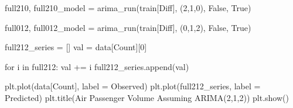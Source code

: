 \documentclass[
  letterpaper,
  DIV=11,
  numbers=noendperiod]{scrartcl}
\newenvironment{Shaded}{\begin{snugshade}}{\end{snugshade}}
\newcommand{\ControlFlowTok}[1]{\textcolor[rgb]{0.00,0.23,0.31}{#1}}
\newcommand{\DecValTok}[1]{\textcolor[rgb]{0.68,0.00,0.00}{#1}}
\newcommand{\KeywordTok}[1]{\textcolor[rgb]{0.00,0.23,0.31}{#1}}
\newcommand{\NormalTok}[1]{\textcolor[rgb]{0.00,0.23,0.31}{#1}}
\newcommand{\OperatorTok}[1]{\textcolor[rgb]{0.37,0.37,0.37}{#1}}
\newcommand{\StringTok}[1]{\textcolor[rgb]{0.13,0.47,0.30}{#1}}
\newcommand{\VariableTok}[1]{\textcolor[rgb]{0.07,0.07,0.07}{#1}}
\begin{document}
\begin{Shaded}
\begin{Highlighting}[]
\NormalTok{full210, full210\_model }\OperatorTok{=}\NormalTok{ arima\_run(train[}\StringTok{\textquotesingle{}Diff\textquotesingle{}}\NormalTok{], (}\DecValTok{2}\NormalTok{,}\DecValTok{1}\NormalTok{,}\DecValTok{0}\NormalTok{), }\VariableTok{False}\NormalTok{, }\VariableTok{True}\NormalTok{)}
\end{Highlighting}
\end{Shaded}

\begin{Shaded}
\begin{Highlighting}[]
\NormalTok{full012, full012\_model }\OperatorTok{=}\NormalTok{ arima\_run(train[}\StringTok{\textquotesingle{}Diff\textquotesingle{}}\NormalTok{], (}\DecValTok{0}\NormalTok{,}\DecValTok{1}\NormalTok{,}\DecValTok{2}\NormalTok{), }\VariableTok{False}\NormalTok{, }\VariableTok{True}\NormalTok{)}
\end{Highlighting}
\end{Shaded}

\begin{Shaded}
\begin{Highlighting}[]
\NormalTok{full212\_series }\OperatorTok{=}\NormalTok{ []}
\NormalTok{val }\OperatorTok{=}\NormalTok{ data[}\StringTok{\textquotesingle{}Count\textquotesingle{}}\NormalTok{][}\DecValTok{0}\NormalTok{]}

\ControlFlowTok{for}\NormalTok{ i }\KeywordTok{in}\NormalTok{ full212:}
\NormalTok{    val }\OperatorTok{+=}\NormalTok{ i}
\NormalTok{    full212\_series.append(val)}
\end{Highlighting}
\end{Shaded}

\begin{Shaded}
\begin{Highlighting}[]
\NormalTok{plt.plot(data[}\StringTok{\textquotesingle{}Count\textquotesingle{}}\NormalTok{], label }\OperatorTok{=} \StringTok{\textquotesingle{}Observed\textquotesingle{}}\NormalTok{)}
\NormalTok{plt.plot(full212\_series, label }\OperatorTok{=} \StringTok{\textquotesingle{}Predicted\textquotesingle{}}\NormalTok{)}
\NormalTok{plt.title(}\StringTok{\textquotesingle{}Air Passenger Volume Assuming ARIMA(2,1,2)\textquotesingle{}}\NormalTok{)}
\NormalTok{plt.show()}
\end{Highlighting}
\end{Shaded}
\end{document}

